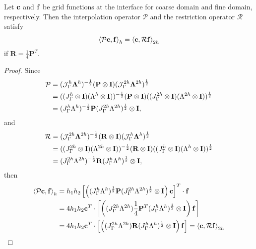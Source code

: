 \begin{lemma}\label{lemma1}
 	Let ${\bf c}$ and ${\bf f}$ be grid functions at the interface for coarse domain and fine domain, respectively. Then the interpolation operator $\mathcal{P}$ and the restriction operator $\mathcal{R}$ satisfy
 	\begin{equation}\label{pr_relation}
 	\left<\mathcal{P} {\bf c}, {\bf f}\right>_h = \left<{\bf c}, \mathcal{R}{\bf f}\right>_{2h}
 	\end{equation}
 	if $\bm{R} = \frac{1}{4}\bm{P}^T$. 
 \end{lemma}
 \begin{proof}
 	Since 
 	\begin{align*}
 	{\mathcal{P}} &= (\mathcal{J}^h_\Gamma \bm{\Lambda}^h)^{-\frac{1}{2}}({\bf P}\otimes{\bf I})(\mathcal{J}^{2h}_\Gamma \bm{\Lambda}^{2h})^{\frac{1}{2}}\\
 	& = ((J_{\Gamma}^h\otimes{\bf I})(\Lambda^h\otimes{\bf I}))^{-\frac{1}{2}}({\bf P}\otimes{\bf I})((J_{\Gamma}^{2h}\otimes{\bf I})(\Lambda^{2h}\otimes{\bf I}))^{\frac{1}{2}}\\
 	& = (J_{\Gamma}^h\Lambda^h)^{-\frac{1}{2}}{\bf P}(J_{\Gamma}^{2h}\Lambda^{2h})^{\frac{1}{2}}\otimes{\bf I},
 	\end{align*}
 	and
 	\begin{align*}
 	{\mathcal{R}} &= (\mathcal{J}^{2h}_\Gamma \bm{\Lambda}^{2h})^{-\frac{1}{2}}({\bf R}\otimes{\bf I})(\mathcal{J}^{h}_\Gamma \bm{\Lambda}^{h})^{\frac{1}{2}}\\
 	& = ((J_{\Gamma}^{2h}\otimes{\bf I})(\Lambda^{2h}\otimes{\bf I}))^{-\frac{1}{2}}({\bf R}\otimes{\bf I})((J_{\Gamma}^{h}\otimes{\bf I})(\Lambda^{h}\otimes{\bf I}))^{\frac{1}{2}}\\
 	& = (J_{\Gamma}^{2h}\Lambda^{2h})^{-\frac{1}{2}}{\bf R}(J_{\Gamma}^{h}\Lambda^{h})^{\frac{1}{2}}\otimes{\bf I},
 	\end{align*}
 	then
 	\begin{align*}
 	\left<\mathcal{P}{\bf c}, {\bf f}\right>_h &= h_1h_2\left[\left((J_{\Gamma}^h\Lambda^h)^{\frac{1}{2}} {\bf P}(J_{\Gamma}^{2h}\Lambda^{2h})^{\frac{1}{2}}\otimes {\bf I}\right){\bf c}\right]^T\cdot{\bf f}\\
 	& = 4h_1h_2 {\bf c}^T \cdot \left[\left((J_{\Gamma}^{2h}\Lambda^{2h})\frac{1}{4}{\bf P}^T(J_{\Gamma}^h\Lambda^h)^{\frac{1}{2}}\otimes {\bf I}\right) {\bf f}\right]\\
 	& =4h_1h_2 {\bf c}^T \cdot \left[\left((J_{\Gamma}^{2h}\Lambda^{2h}){\bf R}(J_{\Gamma}^h\Lambda^h)^{\frac{1}{2}}\otimes {\bf I}\right) {\bf f}\right] = \left<{\bf c}, \mathcal{R}{\bf f}\right>_{2h}
 	\end{align*}
 \end{proof}
 

